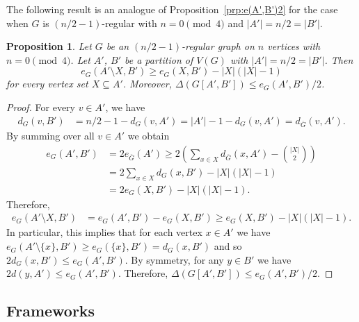 \documentclass{memo-l}
\newtheorem{prop}[firstthm]{Proposition}
\numberwithin{section}{chapter}
\numberwithin{equation}{section}
\numberwithin{firstthm}{section}
\numberwithin{figure}{section}
\begin{document}
The following result is an analogue of Proposition~\ref{prp:e(A',B')2} for the case when $G$ is $(n/2-1)$-regular with $n = 0 \pmod4$ and $|A'| = n/2 = |B'|$.


\begin{prop}  \label{prp:e(A',B')3}
Let $G$ be an $(n/2-1)$-regular graph on $n$ vertices with $n = 0 \pmod{4}$.
Let $A'$, $ B'$ be a partition of $V(G)$ with $|A'| = n/2 = |B'|$.
Then $$e_G(A' \setminus X,B') \ge e_G( X, B' ) - |X|(|X|-1)$$
for every vertex set $X \subseteq A'$.
Moreover, $\Delta(G[A',B']) \le e_G(A',B')/2$.
\end{prop}
\begin{proof}
For every $v \in A'$, we have
\begin{align*}
  d_G(v,B')  & = n/2 - 1 - d_G(v,A') = |A'| -1  - d_G(v,A')	=  d_{\overline{G}}(v,A') .
\end{align*}
By summing over all $v \in A'$ we obtain
\begin{align*}
e_G(A',B') & = 2e_{\overline{G}}(A')  \ge  2 \left( \sum_{ x \in X} d_{\overline{G}}(x,A') - \binom{|X|}{2} \right) \\ &
 =  2 \sum_{ x \in X} d_{G}(x,B') - |X|(|X|-1)\\
& = 2 e_G(X, B') - |X| (|X|-1).
\end{align*}
Therefore,
\begin{align}
\nonumber	e_G( A' \setminus X, B') & = e_G(A',B') -e_G(X,B')
\nonumber \ge e_G(X,B') - |X| (|X|-1).
\end{align}
In particular, this implies that for each vertex $x \in A'$ we have $e_G( A' \setminus \{x\}, B') \ge e_G(\{x\},B') = d_G(x,B')$ and so $2 d_G(x,B') \le e_G( A', B')$.
By symmetry, for any $y \in B'$ we have $2 d(y,A') \le e_G( A', B')$.
Therefore, $\Delta( G[A',B']) \le e_G( A', B')/2$.
\end{proof}


\subsection{Frameworks}
\end{document}
